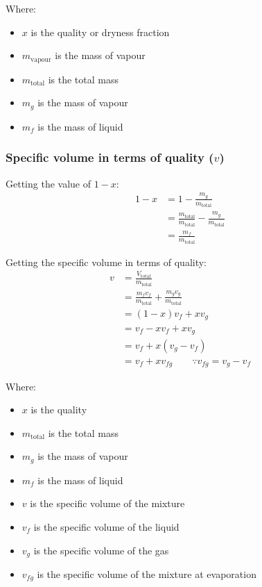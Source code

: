 \documentclass[11pt]{article}
\begin{document}
Where:
\begin{itemize}
\item \(x\) is the quality or dryness fraction
\item \(m_{\text{vapour}}\) is the mass of vapour
\item \(m_{\text{total}}\) is the total mass
\item \(m_g\) is the mass of vapour
\item \(m_f\) is the mass of liquid
\end{itemize}

\newpage
\subsubsection{Specific volume in terms of quality (\(v\))}
\label{sec:org1e119ce}
Getting the value of \(1 - x\):
\begin{align*}
1 - x &= 1 - \frac{m_g}{m_{\text{total}}} \\
&= \frac{m_{\text{total}}}{m_{\text{total}}} - \frac{m_g}{m_{\text{total}}} \\
&= \frac{m_f}{m_{\text{total}}}
\end{align*}

 \noindent Getting the specific volume in terms of quality:
\begin{align*}
v &= \frac{V_{\text{total}}}{m_{\text{total}}} \\
&= \frac{m_f v_f}{m_{\text{total}}} + \frac{m_g v_g}{m_{\text{total}}} \\
&= (1 - x) v_f + x v_g \\
&= v_f - x v_f + x v_g \\
&= v_f + x (v_g - v_f) \\
&= v_f + xv_{fg} \qquad \because v_{fg} = v_g - v_f
\end{align*}

Where:
\begin{itemize}
\item \(x\) is the quality
\item \(m_{\text{total}}\) is the total mass
\item \(m_g\) is the mass of vapour
\item \(m_f\) is the mass of liquid
\item \(v\) is the specific volume of the mixture
\item \(v_f\) is the specific volume of the liquid
\item \(v_g\) is the specific volume of the gas
\item \(v_{fg}\) is the specific volume of the mixture at evaporation
\end{itemize}
\end{document}
